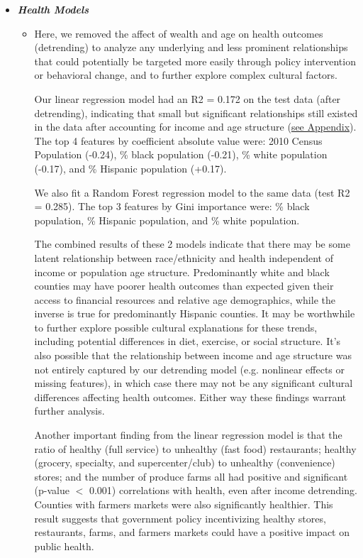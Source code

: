 \documentclass{article}
\begin{document}
\begin{itemize}[leftmargin=0pt]
\begin{itemize}
\item[] \textbf{\textit{Health Models}}
\begin{itemize}
    \item[] Here, we removed the affect of wealth and age on health outcomes (detrending) to analyze any underlying and less prominent relationships that could potentially be targeted more easily through policy intervention or behavioral change, and to further explore complex cultural factors.
    
    Our linear regression model had an R2 = 0.172 on the test data (after detrending), indicating that small but significant relationships still existed in the data after accounting for income and age structure (\hyperref[fig:statsmodelsOLS]{see Appendix}). The top 4 features by coefficient absolute value were: 2010 Census Population (-0.24), \% black population (-0.21), \% white population (-0.17), and \% Hispanic population (+0.17).  

    We also fit a Random Forest regression model to the same data (test R2 = 0.285). The top 3 features by Gini importance were: \% black population, \% Hispanic population, and \% white population. 

    The combined results of these 2 models indicate that there may be some latent relationship between race/ethnicity and health independent of income or population age structure. Predominantly white and black counties may have poorer health outcomes than expected given their access to financial resources and relative age demographics, while the inverse is true for predominantly Hispanic counties. It may be worthwhile to further explore possible cultural explanations for these trends, including potential differences in diet, exercise, or social structure. It’s also possible that the relationship between income and age structure was not entirely captured by our detrending model (e.g. nonlinear effects or missing features), in which case there may not be any significant cultural differences affecting health outcomes. Either way these findings warrant further analysis. 

    Another important finding from the linear regression model is that the ratio of healthy (full service) to unhealthy (fast food) restaurants; healthy (grocery, specialty, and supercenter/club) to unhealthy (convenience) stores; and the number of produce farms all had positive and significant (p-value $<$ 0.001) correlations with health, even after income detrending. Counties with farmers markets were also significantly healthier. This result suggests that government policy incentivizing healthy stores, restaurants, farms, and farmers markets could have a positive impact on public health. 


\end{itemize}
\end{itemize}
\end{itemize}
\end{document}
